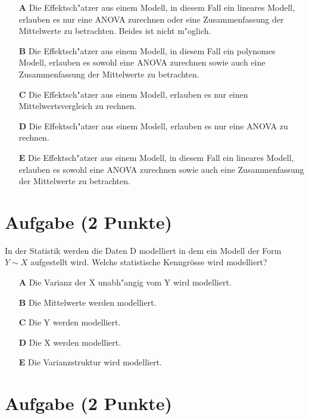 \documentclass[a4paper, 10pt]{scrartcl}\usepackage[]{graphicx}\usepackage[]{xcolor}
\begin{document}
\begin{enumerate}
\item [\textbf{A} \msquare] Die Effektsch{"a}tzer aus einem Modell, in diesem Fall ein lineares Modell, erlauben es nur eine ANOVA zurechnen oder eine Zusammenfassung der Mittelwerte zu betrachten. Beides ist nicht m{"o}glich.
\item [\textbf{B} \msquare] Die Effektsch{"a}tzer aus einem Modell, in diesem Fall ein polynomes Modell, erlauben es sowohl eine ANOVA zurechnen sowie auch eine Zusammenfassung der Mittelwerte zu betrachten.
\item [\textbf{C} \msquare] Die Effektsch{"a}tzer aus einem Modell, erlauben es nur einen Mittelwertsvergleich zu rechnen.
\item [\textbf{D} \msquare] Die Effektsch{"a}tzer aus einem Modell, erlauben es nur eine ANOVA zu rechnen. 
\item [\textbf{E} \msquare] Die Effektsch{"a}tzer aus einem Modell, in diesem Fall ein lineares Modell, erlauben es sowohl eine ANOVA zurechnen sowie auch eine Zusammenfassung der Mittelwerte zu betrachten.
\end{enumerate}

\section{Aufgabe \hfill (2 Punkte)}

In der Statistik werden die Daten D modelliert in dem ein Modell der Form
$Y \sim X$ aufgestellt wird. Welche statistische Kenngr{\"o}sse wird modelliert? 



\begin{enumerate}
\item [\textbf{A} \msquare] Die Varianz der X unabh{"a}ngig vom Y wird modelliert.
\item [\textbf{B} \msquare] Die Mittelwerte werden modelliert.
\item [\textbf{C} \msquare] Die Y werden modelliert.
\item [\textbf{D} \msquare] Die X werden modelliert.
\item [\textbf{E} \msquare] Die Varianzstruktur wird modelliert.
\end{enumerate}

\section{Aufgabe \hfill (2 Punkte)}
\end{document}

